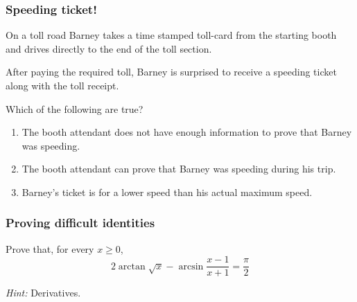 \begin{frame}[t]
	\fontsize{13}{13}\selectfont
	\frametitle{Speeding ticket!}

	On a toll road Barney takes a time stamped toll-card from the starting booth and
	drives directly to the end of the toll section. \\
	\vspace{.2cm}

	After paying the required toll, Barney is surprised to receive a speeding
	ticket along with the toll receipt. \\
	\vspace{.2cm}

	Which of the following are true?
	\vspace{.2cm}
	\begin{enumerate}
		\item The booth attendant does not have enough information to prove that Barney
			was speeding.

		\item The booth attendant can prove that Barney was speeding during his trip.

		\item Barney's ticket is for a lower speed than his actual maximum speed.
	\end{enumerate}
\end{frame}

\begin{frame}[t]
	\frametitle{Proving difficult identities}

	\begin{block}{}
		Prove that, for every $x \geq 0$,
		\[
			2 \arctan \sqrt{x}- \arcsin \frac{x-1}{x+1}= \frac{\pi}{2}
		\]
	\end{block}

	\emph{Hint:} Derivatives.
\end{frame}

